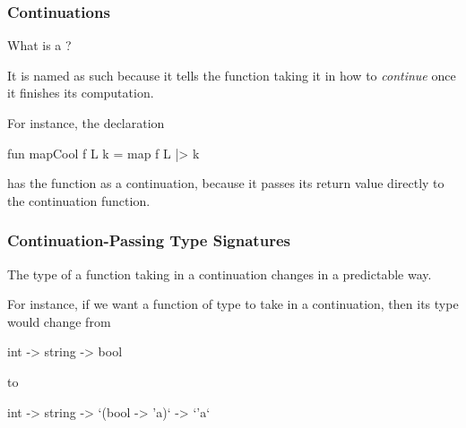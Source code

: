 \documentclass[aspectratio=169]{beamer}
\begin{document}

\begin{frame}[fragile]
  \frametitle{Continuations}

  What is a ?

  \pause
  \vspace{\fill}


  \pause
  \vspace{\fill}

  It is named as such because it tells the function taking it in how to
  \textit{continue} once it finishes its computation.

  \pause
  \vspace{\fill}

  For instance, the declaration
  \begin{codeblock}
    fun mapCool f L k = map f L |> k
  \end{codeblock}
  has the function  as a continuation, because it passes its
  return value directly to the continuation function.
\end{frame}

\begin{frame}[fragile]
  \frametitle{Continuation-Passing Type Signatures}

  The type of a function taking in a continuation changes in a predictable way.

  \pause
  \vspace{\fill}

  For instance, if we want a function of type  to
  take in a continuation, then its type would change from
  \begin{codeblock}
    int -> string -> bool
  \end{codeblock}
  to
  \begin{codeblock}
    int -> string -> `(bool -> 'a)` -> `'a`
  \end{codeblock}

  \pause
  \vspace{\fill}

\end{frame}
\end{document}
